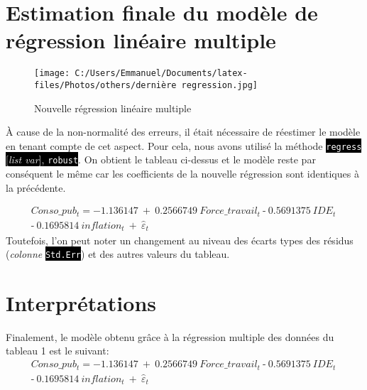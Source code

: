 \documentclass[a4paper, 12pt, openany]{book}
\begin{document}
\section{Estimation finale du modèle de régression linéaire multiple }
\begin{figure}[H]
    \centering
    \texttt{[image: C:/Users/Emmanuel/Documents/latex-files/Photos/others/dernière regression.jpg]}
    \caption{Nouvelle régression linéaire multiple}
\end{figure}
\begin{spacing}{1.3}

À cause de la non-normalité des erreurs, il était nécessaire de réestimer le modèle en tenant 
compte de cet aspect. Pour cela, nous avons utilisé la méthode \colorbox{black}{\textcolor{white}{\texttt{regress} [\textit{list var}], \texttt{robust}}}. On obtient le tableau ci-dessus
et le modèle reste par conséquent le même car les coefficients de la nouvelle régression sont identiques à la précédente.
\end{spacing}
\vspace*{-1cm}
\begin{multline*}
	Conso\_pub_t= -1.136147\ +\ 0.2566749\ Force\_travail_t\ ‐ \ 0.5691375\ IDE_t\ \\‐ \ 0.1695814\ inflation_t\ +\ \hat{\varepsilon}_t
\end{multline*}
\linebreak
Toutefois, l'on peut noter un changement au niveau des écarts types des résidus (\textit{colonne} \colorbox{black}{\textcolor{white}{\texttt{Std.Err}}}) et
 des autres valeurs du tableau.
\section{Interprétations}

\hspace{.8cm}Finalement, le modèle obtenu grâce à la régression multiple des données du tableau 1 est le suivant: 
\vspace*{-0.5cm}
\begin{multline*}
    Conso\_pub_t= -1.136147\ +\ 0.2566749\ Force\_travail_t\ ‐ \ 0.5691375\ IDE_t\ \\ ‐ \ 0.1695814\ inflation_t\ +\ \hat{\varepsilon}_t
\end{multline*}
\end{document}
